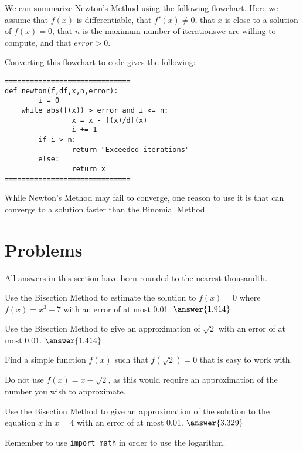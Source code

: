 \documentclass{ximera}
\begin{document}
We can summarize Newton's Method using the following flowchart. Here we assume that $f(x)$ is differentiable, that $f'(x)\neq 0$, that $x$ is close to a solution of $f(x)=0$, that $n$ is the maximum number of iterationswe are willing to compute, and that $error>0$.

\begin{center}
\end{center}

Converting this flowchart to code gives the following:

\begin{verbatim}
==============================
def newton(f,df,x,n,error):
        i = 0
	while abs(f(x)) > error and i <= n:
                x = x - f(x)/df(x)
                i += 1
        if i > n:
                return "Exceeded iterations"
        else:
                return x
==============================
\end{verbatim}

While Newton's Method may fail to converge, one reason to use it is that can converge to a solution faster than the Binomial Method.

\section{Problems}

All answers in this section have been rounded to the nearest thousandth.

\begin{question}
	Use the Bisection Method to estimate the solution to $f(x)=0$ where $f(x)=x^3-7$ with an error of at most 0.01. $\answer{1.914}$ 
\end{question}

\begin{question}
	Use the Bisection Method to give an approximation of $\sqrt{2}$ with an error of at most 0.01. $\answer{1.414}$
	\begin{hint}
		Find a simple function $f(x)$ such that $f(\sqrt{2})=0$ that is easy to work with.
	\end{hint}
	\begin{hint}
		Do not use $f(x)=x-\sqrt{2}$, as this would require an approximation of the number you wish to approximate.
	\end{hint}
\end{question}

\begin{question}
	Use the Bisection Method to give an approximation of the solution to the equation $x\ln{x}=4$ with an error of at most 0.01. $\answer{3.329}$
	\begin{hint}
		Remember to use \verb|import math| in order to use the logarithm.
	\end{hint}
\end{question}
\end{document}
